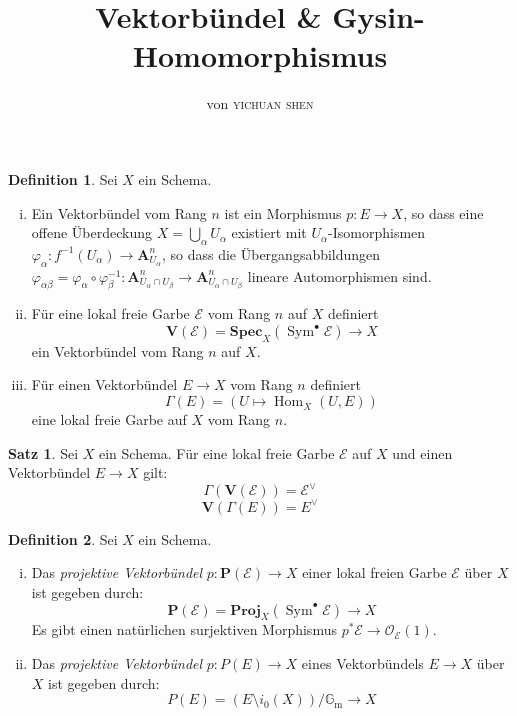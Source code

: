 \documentclass[10pt,b5paper]{article}
\author{von \textsc{yichuan shen}}
\title{Vektorbündel \& Gysin-Homomorphismus}
\begin{document}
\theoremstyle{plain}
\theoremstyle{definition}
\newtheorem{theorem}{Theorem}
\newtheorem{lemma}[theorem]{Lemma}
\newtheorem{proposition}[theorem]{Satz}
\newtheorem{corollary}[theorem]{Korollar}
\theoremstyle{definition}
\newtheorem*{definition}{Definition}
\newtheorem*{example}{Beispiel}
\theoremstyle{remark}
\newtheorem*{remark}{Bemerkung}

\maketitle

\begin{definition}
Sei $X$ ein Schema.
\begin{enumerate}[(i)]
\item Ein Vektorbündel vom Rang $n$ ist ein Morphismus $p: E\to X$, so dass eine offene Überdeckung $X=\bigcup_\alpha U_\alpha$ existiert mit $U_\alpha$-Isomorphismen $\varphi_\alpha: f^{-1}(U_\alpha)\to \mathbf{A}_{U_\alpha}^n$, so dass die Übergangsabbildungen $\varphi_{\alpha\beta} = \varphi_\alpha\circ\varphi_\beta^{-1}: \mathbf{A}^n_{U_\alpha\cap U_\beta}\to\mathbf{A}^n_{U_\alpha\cap U_\beta}$ lineare Automorphismen sind.
\item Für eine lokal freie Garbe $\mathcal{E}$ vom Rang $n$ auf $X$ definiert
\[ \mathbf{V}(\mathcal{E}) = \mathbf{Spec}_X(\operatorname{Sym}^\bullet\mathcal{E})\to X \]
ein Vektorbündel vom Rang $n$ auf $X$.
\item Für einen Vektorbündel $E\to X$ vom Rang $n$ definiert
\[ \Gamma(E) = (U\mapsto \operatorname{Hom}_X(U, E)) \]
eine lokal freie Garbe auf $X$ vom Rang $n$.
\end{enumerate}
\end{definition}

\begin{proposition}
Sei $X$ ein Schema. Für eine lokal freie Garbe $\mathcal{E}$ auf $X$ und einen Vektorbündel $E\to X$ gilt:
\[ \Gamma(\mathbf{V}(\mathcal{E})) = \mathcal{E}^\vee \]
\[ \mathbf{V}(\Gamma(E)) = E^\vee \]
\end{proposition}

\begin{definition}
Sei $X$ ein Schema.
\begin{enumerate}[(i)]
\item Das \textit{projektive Vektorbündel} $p: \mathbf{P}(\mathcal{E})\to X$ einer lokal freien Garbe $\mathcal{E}$ über $X$ ist gegeben durch:
\[ \mathbf{P}(\mathcal{E}) = \mathbf{Proj}_X(\operatorname{Sym}^\bullet\mathcal{E})\to X \]
Es gibt einen natürlichen surjektiven Morphismus $p^\ast\mathcal{E} \to \mathcal{O}_\mathcal{E}(1)$.
\item Das \textit{projektive Vektorbündel} $p: P(E)\to X$ eines Vektorbündels $E\to X$ über $X$ ist gegeben durch:
\[ P(E) = (E\setminus i_0(X))/\mathbb{G}_\text{m}\to X \]
\end{enumerate}
\end{definition}
\end{document}

